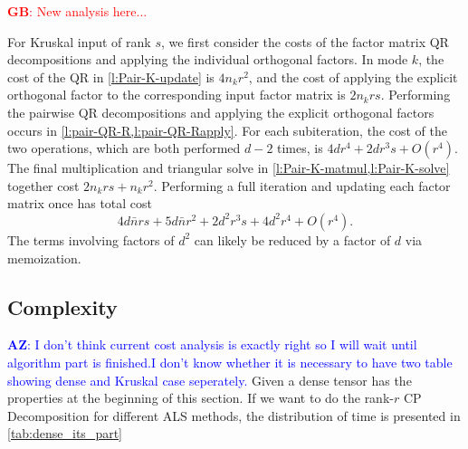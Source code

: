 \documentclass{article}
\newcommand{\GB}[1]{\textcolor{red}{\textbf{GB}: #1}}
\newcommand{\AZ}[1]{\textcolor{blue}{\textbf{AZ}: #1}}
\begin{document}
\GB{New analysis here...}

For Kruskal input of rank $s$, we first consider the costs of the factor matrix QR decompositions and applying the individual orthogonal factors.
In mode $k$, the cost of the QR in \cref{l:Pair-K-update} is $4n_kr^2$, and the cost of applying the explicit orthogonal factor to the corresponding input factor matrix is $2n_krs$.
Performing the pairwise QR decompositions and applying the explicit orthogonal factors occurs in \cref{l:pair-QR-R,l:pair-QR-Rapply}.
For each subiteration, the cost of the two operations, which are both performed $d-2$ times, is $4dr^4+2dr^3s+O(r^4)$.
The final multiplication and triangular solve in \cref{l:Pair-K-matmul,l:Pair-K-solve} together cost $2n_krs+n_kr^2$.
Performing a full iteration and updating each factor matrix once has total cost
$$ 4d\bar{n}rs + 5d\bar{n}r^2 + 2d^2r^3s + 4d^2r^4 + O(r^4). $$
The terms involving factors of $d^2$ can likely be reduced by a factor of $d$ via memoization.

\subsection{Complexity}
\AZ{I don't think current cost analysis is exactly right so I will wait until algorithm part is finished.I don't know whether it is necessary to have two table showing dense and Kruskal case seperately.}
Given a dense tensor has the properties at the beginning of this section. 
If we want to do the rank-$r$ CP Decomposition for different ALS methods, the distribution of time is presented in \cref{tab:dense_its_part}
\end{document}
